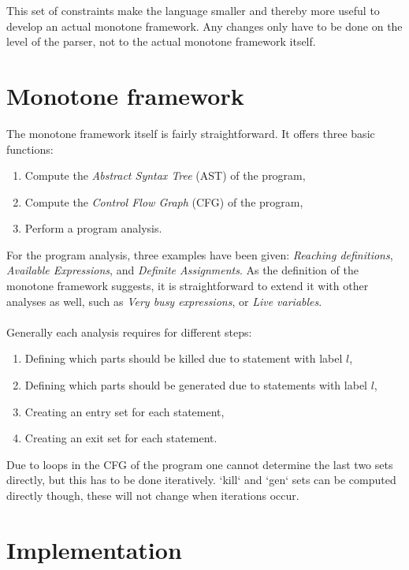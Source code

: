 \documentclass[paper=a4, fontsize=11pt]{scrartcl} %
\numberwithin{equation}{section} %
\numberwithin{figure}{section} %
\numberwithin{table}{section} %
\begin{document}
This set of constraints make the language smaller and thereby more useful to develop an actual monotone framework.
Any changes only have to be done on the level of the parser, not to the actual monotone framework itself.

\section{Monotone framework}

The monotone framework itself is fairly straightforward. It offers three basic functions:

\begin{enumerate}
\item Compute the \textit{Abstract Syntax Tree} (AST) of the program,
\item Compute the \textit{Control Flow Graph} (CFG) of the program,
\item Perform a program analysis.
\end{enumerate}

For the program analysis, three examples have been given:
\textit{Reaching definitions},
\textit{Available Expressions},
and \textit{Definite Assignments}.
As the definition of the monotone framework suggests, it is straightforward to extend it with other analyses as well, such as \textit{Very busy expressions}, or \textit{Live variables}.
\\
\\
Generally each analysis requires for different steps:

\begin{enumerate}
\item Defining which parts should be killed due to statement with label $l$,
\item Defining which parts should be generated due to statements with label $l$,
\item Creating an entry set for each statement,
\item Creating an exit set for each statement.
\end{enumerate}

Due to loops in the CFG of the program one cannot determine the last two sets directly,
but this has to be done iteratively.
`kill` and `gen` sets can be computed directly though,
these will not change when iterations occur.

\section{Implementation}
\end{document}

